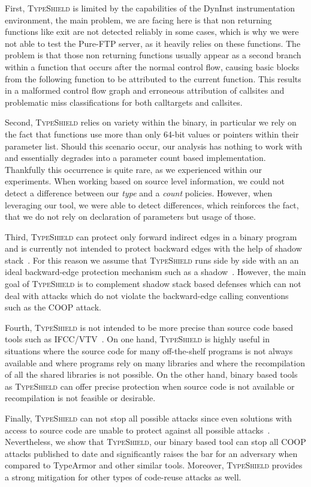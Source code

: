 First, \textsc{TypeShield} is limited by the capabilities of the DynInst instrumentation environment, the main problem,
we are facing here is that non returning functions like exit are not detected reliably in some cases, which is
why we were not able to test the Pure-FTP server, as it heavily relies on these functions. The problem is that
those non returning functions usually appear as a second branch within a function that occurs after the normal
control flow, causing basic blocks from the following function to be attributed to the current function. This
results in a malformed control flow graph and erroneous attribution of callsites and problematic miss classifications
for both calltargets and callsites.

Second, \textsc{TypeShield} relies on variety within the binary, in particular we rely on
the fact that functions use more than only 64-bit values or pointers within their parameter list. Should this
scenario occur, our analysis has nothing to work with and essentially degrades into a parameter count based
implementation. Thankfully this occurrence is quite rare, as we experienced within our experiments. When working
based on source level information, we could not detect a difference between our \textit{type} and a \textit{count} policies. 
However, when leveraging our tool, we were able to detect differences, which reinforces the fact, that we do 
not rely on declaration of parameters but usage of those.

Third, \textsc{TypeShield} can protect only forward indirect edges in a binary program and is currently not 
intended to protect backward edges with the help of shadow stack~\cite{dang:asiaccs}. For this reason we assume that 
\textsc{TypeShield} runs side by side with an an ideal backward-edge protection mechanism such as a shadow~\cite{conti:ccs}. 
However, the main goal of \textsc{TypeShield} is to complement shadow stack based defenses which can not deal with attacks 
which do not violate the backward-edge calling conventions such as the COOP attack.

Fourth, \textsc{TypeShield} is not intended to be more precise than source code based tools such as 
IFCC/VTV~\cite{vtv:tice}.
On one hand, \textsc{TypeShield} is highly useful in situations where
the source code for many off-the-shelf programs is not always available and where
programs rely on many libraries and where the recompilation of all the shared libraries 
is not possible. On the other hand, binary based tools as \textsc{TypeShield} can offer precise protection when
source code is not available or recompilation is not feasible or desirable.

Finally, \textsc{TypeShield} can not stop all possible attacks since even solutions 
with access to source code are unable to protect against all possible attacks~\cite{carlini:bending}.
Nevertheless, we show that \textsc{TypeShield}, our binary based tool can stop all 
COOP attacks published to date and significantly raises the bar for an adversary when compared to
TypeArmor and other similar tools. Moreover, \textsc{TypeShield} provides a strong mitigation 
for other types of code-reuse attacks as well.

